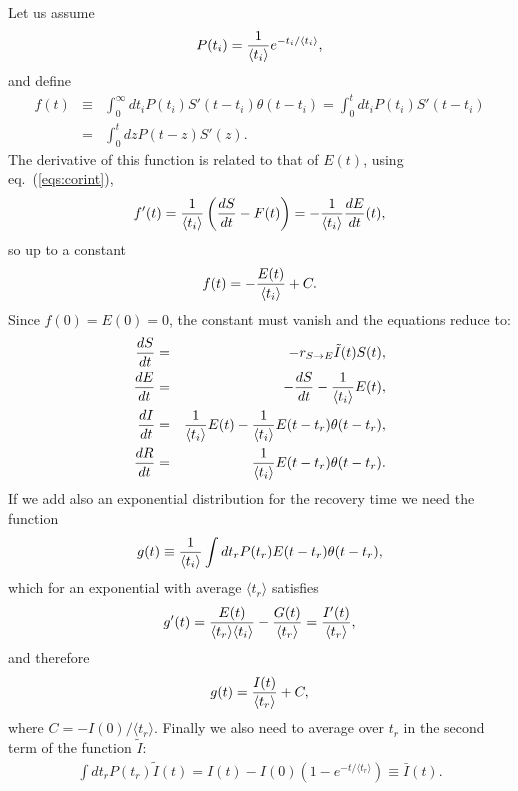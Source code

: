 \documentclass[a4paper,oneside,11pt]{article}
\begin{document}
 Let us assume
\begin{eqnarray}
P(t_i) = {1\over \langle t_i\rangle} e^{-t_i/\langle t_i\rangle},
\end{eqnarray}
and define
\begin{eqnarray}
f(t) &\equiv& \int_0^\infty dt_i P(t_i) S'(t-t_i) \theta(t-t_i) = \int_0^t dt_i P(t_i)  S'(t-t_i) \nonumber\\
&=& \int_0^t dz P(t-z) S'(z).
\end{eqnarray}
The derivative of this function is related to that of $E(t)$, using eq.~(\ref{eqs:corint}),
\begin{eqnarray}
f'(t) = {1\over \langle t_i\rangle} \left({d S\over dt}-F(t)\right) = - {1\over \langle t_i\rangle} {dE\over d t}(t),
\end{eqnarray}
so up to a constant
\begin{eqnarray}
f(t) = -{E(t)\over \langle t_i\rangle} +C.
\end{eqnarray}
Since $f(0) = E(0) =0$, the constant must vanish and the equations reduce to:
\begin{eqnarray}
{d S\over dt} &=& - r_{S\rightarrow E} \tilde{I}(t) S(t),\nonumber\\
{d E\over dt} &=& -{d S\over d t} - {1 \over \langle t_i\rangle} E(t) ,\nonumber\\
{d I\over dt} &=& {1 \over \langle t_i\rangle} E(t) -{1\over \langle t_i\rangle} E(t-t_r) \theta(t-t_r),\nonumber\\
{d R\over d t} &=&  {1\over  \langle t_i\rangle} E(t-t_r) \theta(t-t_r).
\end{eqnarray}
If we add also an exponential distribution for the recovery time we need the function
\begin{eqnarray}
g(t) \equiv {1\over \langle t_i\rangle } \int dt_r P(t_r) E(t-t_r) \theta(t-t_r),
\end{eqnarray}
which for an exponential with average $\langle t_r\rangle$ satisfies
\begin{eqnarray}
g'(t) = {E(t)\over \langle t_r\rangle \langle t_i\rangle} - {G(t)\over  \langle t_r\rangle} = {I'(t)\over \langle t_r \rangle},
\end{eqnarray}
and therefore
\begin{eqnarray}
g(t) = {I(t)\over \langle t_r \rangle} + C,
\end{eqnarray}
where $C= -I(0)/\langle t_r \rangle$.
Finally we also need to average over $t_r$ in the second term of the function $\tilde{I}$:
\begin{eqnarray}
\int d t_r P(t_r) \tilde{I}(t) = I(t) - I(0) \left(1- e^{-t/\langle t_r\rangle}  \right) \equiv \bar{I}(t).
\end{eqnarray}
\end{document}

